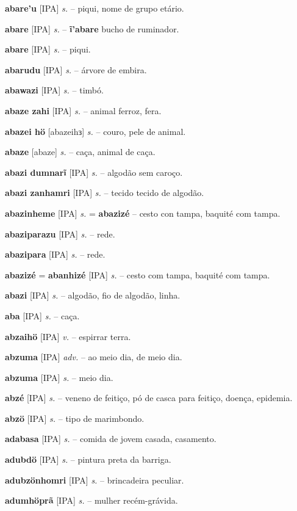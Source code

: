 \textbf{abare'u} [IPA] \textit{s.} -- piqui,  nome de grupo etário.

\textbf{abare} [IPA] \textit{s.} -- \textbf{ĩ'abare} bucho de ruminador.

\textbf{abare} [IPA] \textit{s.} -- piqui.

\textbf{abarudu} [IPA] \textit{s.} -- árvore de embira.

\textbf{abawazi} [IPA] \textit{s.} -- timbó.

\textbf{abaze zahi} [IPA] \textit{s.} -- animal ferroz, fera.

\textbf{abazei hö} [abazeihɜ] \textit{s.} -- couro, pele de animal.

\textbf{abaze} [abaze] \textit{s.} -- caça, animal de caça.

\textbf{abazi dumnarĩ} [IPA] \textit{s.} -- algodão sem caroço.

\textbf{abazi zanhamri} [IPA] \textit{s.} -- tecido tecido de algodão.

\textbf{abazinheme} [IPA] \textit{s.} = \textbf{abazizé} -- cesto con tampa, baquité com tampa.

\textbf{abaziparazu} [IPA] \textit{s.} -- rede.

\textbf{abazipara} [IPA] \textit{s.} -- rede.

\textbf{abazizé} = \textbf{abanhizé} [IPA] \textit{s.} -- cesto com tampa, baquité com tampa.

\textbf{abazi} [IPA] \textit{s.} -- algodão, fio de algodão, linha.

\textbf{aba} [IPA] \textit{s.} -- caça.

\textbf{abzaihö} [IPA] \textit{v.} -- espirrar terra.

\textbf{abzuma} [IPA] \textit{adv.} -- ao meio dia, de meio dia.

\textbf{abzuma} [IPA] \textit{s.} -- meio dia.

\textbf{abzé} [IPA] \textit{s.} -- veneno de feitiço, pó de casca para feitiço, doença, epidemia.

\textbf{abzö} [IPA] \textit{s.} -- tipo de marimbondo.

\textbf{adabasa} [IPA] \textit{s.} -- comida de jovem casada, casamento.

\textbf{adubdö} [IPA] \textit{s.} -- pintura preta da barriga.

\textbf{adubzönhomri} [IPA] \textit{s.} -- brincadeira peculiar.

\textbf{adumhöprã} [IPA] \textit{s.} -- mulher recém-grávida.

